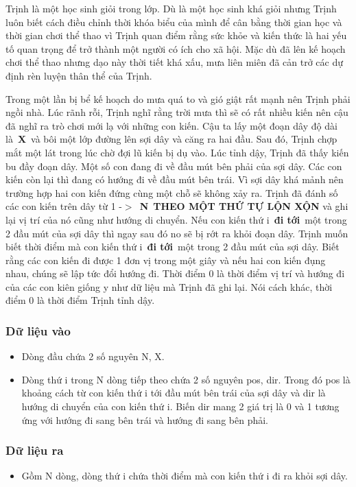 

Trịnh là một học sinh giỏi trong lớp. Dù là một học sinh khá giỏi nhưng Trịnh luôn biết cách điều chỉnh thời khóa biểu của mình để cân bằng thời gian học và thời gian chơi thể thao vì Trịnh quan điểm rằng sức khỏe và kiến thức là hai yếu tố quan trọng để trở thành một người có ích cho xã hội. Mặc dù đã lên kế hoạch chơi thể thao nhưng dạo này thời tiết khá xấu, mưa liên miên đã cản trở các dự định rèn luyện thân thể của Trịnh.

Trong một lần bị bể kế hoạch do mưa quá to và gió giật rất mạnh nên Trịnh phải ngồi nhà. Lúc rãnh rỗi, Trịnh nghĩ rằng trời mưa thì sẽ có rất nhiều kiến nên cậu đã nghĩ ra trò chơi mới lạ với những con kiến. Cậu ta lấy một đoạn dây độ dài là \textbf{X} và bôi một lớp đường lên sợi dây và căng ra hai đầu. Sau đó, Trịnh chợp mắt một lát trong lúc chờ đợi lũ kiến bị dụ vào. Lúc tỉnh dậy, Trịnh đã thấy kiến bu đầy đoạn dây. Một số con đang đi về đầu mút bên phải của sợi dây. Các con kiến còn lại thì đang có hướng đi về đầu mút bên trái. Vì sợi dây khá mảnh nên trường hợp hai con kiến đứng cùng một chỗ sẽ không xảy ra. Trịnh đã đánh số các con kiến trên dây từ 1 -$>$ \textbf{N} \textbf{THEO MỘT THỨ TỰ LỘN XỘN} và ghi lại vị trí của nó cũng như hướng di chuyển. Nếu con kiến thứ i \textbf{đi tới} một trong 2 đầu mút của sợi dây thì ngay sau đó no sẽ bị rớt ra khỏi đoạn dây. Trịnh muốn biết thời điểm mà con kiến thứ i \textbf{đi tới} một trong 2 đầu mút của sợi dây. Biết rằng các con kiến đi được 1 đơn vị trong một giây và nếu hai con kiến đụng nhau, chúng sẽ lập tức đổi hướng đi. Thời điểm 0 là thời điểm vị trí và hướng đi của các con kiên giống y như dữ liệu mà Trịnh đã ghi lại. Nói cách khác, thời điểm 0 là thời điểm Trịnh tỉnh dậy.

\subsubsection{Dữ liệu vào}
\begin{itemize}
	\item Dòng đầu chứa 2 số nguyên N, X.
	\item Dòng thứ i trong N dòng tiếp theo chứa 2 số nguyên pos, dir. Trong đó pos là khoảng cách từ con kiến thứ i tới đầu mút bên trái của sợi dây và dir là hướng di chuyển của con kiến thứ i. Biến dir mang 2 giá trị là 0 và 1 tương ứng với hướng đi sang bên trái và hướng đi sang bên phải.
\end{itemize}

\subsubsection{Dữ liệu ra}
\begin{itemize}
	\item Gồm N dòng, dòng thứ i chứa thời điểm mà con kiến thứ i đi ra khỏi sợi dây.
\end{itemize}

